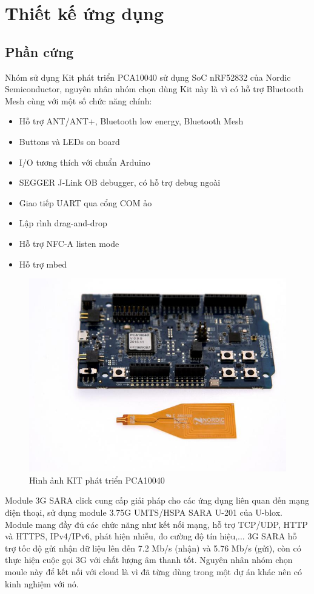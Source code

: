 \chapter{Thiết kế ứng dụng}    
\section{Phần cứng} 
    Nhóm sử dụng Kit phát triển PCA10040 sử dụng SoC nRF52832 của Nordic Semiconductor, nguyên nhân nhóm chọn dùng Kit này là vì có hỗ trợ Bluetooth Mesh cùng với một số chức năng chính:
    \begin{itemize}
        \item Hỗ trợ ANT/ANT+, Bluetooth low energy, Bluetooth Mesh
        \item Buttons và LEDs on board
        \item I/O tương thích với chuẩn Arduino
        \item SEGGER J-Link OB debugger, có hỗ trợ debug ngoài
        \item Giao tiếp UART qua cổng COM ảo
        \item Lập rình drag-and-drop
        \item Hỗ trợ NFC-A listen mode
        \item Hỗ trợ mbed
    \end{itemize}
 
    
    \begin{figure}[h!]
    	\begin{center}
    		\includegraphics[scale=1.3]{images/nrf52-dk.jpg}
    		\caption{Hình ảnh KIT phát triển PCA10040}
    	\end{center}
    \end{figure}
    \newpage
    Module 3G SARA click cung cấp giải pháp cho các ứng dụng liên quan đến mạng điện thoại, sử dụng module 3.75G UMTS/HSPA SARA U-201 của U-blox. Module mang đầy đủ các chức năng như kết nối mạng, hỗ trợ TCP/UDP, HTTP và HTTPS, IPv4/IPv6, phát hiện nhiễu, đo cường độ tín hiệu,... 3G SARA hỗ trợ tốc độ gửi nhận dữ liệu lên đến 7.2 Mb/s (nhận) và 5.76 Mb/s (gửi), còn có thực hiện cuộc gọi 3G với chất lượng âm thanh tốt. Nguyên nhân nhóm chọn moule này để kết nối với cloud là vì đã từng dùng trong một dự án khác nên có kinh nghiệm với nó.

